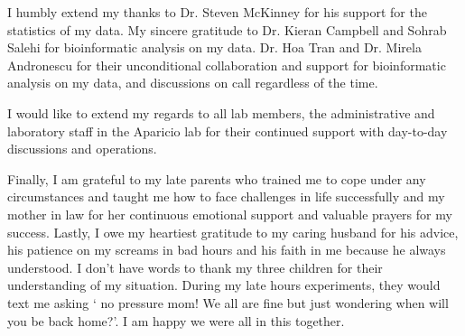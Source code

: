 I humbly extend my thanks to Dr. Steven McKinney for his support for the statistics of my data. My sincere gratitude to Dr. Kieran Campbell and Sohrab Salehi for bioinformatic analysis on my data. Dr. Hoa Tran and Dr. Mirela Andronescu for their unconditional collaboration and support for bioinformatic analysis on my data, and discussions on call regardless of the time.  

I would like to extend my regards to all lab members, the administrative and laboratory staff in the Aparicio lab for their continued support with day-to-day discussions and operations.

Finally, I am grateful to my late parents who trained me to cope under any circumstances and taught me how to face challenges in life successfully and my mother in law for her continuous emotional support and valuable prayers for my success. Lastly, I owe my heartiest gratitude to my caring husband for his advice, his patience on my screams in bad hours and his faith in me because he always understood. I don't have words to thank my three children for their understanding of my situation. During my late hours experiments, they would text me asking  ` no pressure mom! We all are fine but just wondering when will you be back home?'. I am happy we were all in this together.